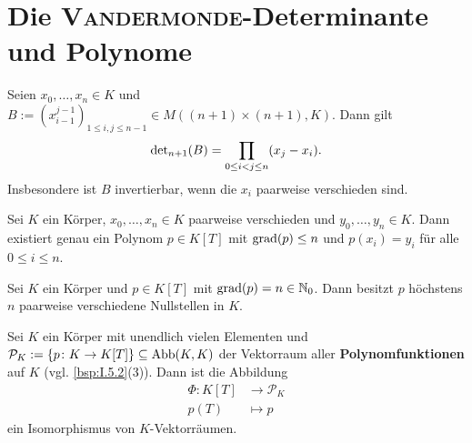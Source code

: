 \section{Die \textsc{Vandermonde}-Determinante und Polynome}

\begin{satz}
	\label{satz:I.15.1}
	Seien $x_0,\dots,x_n \in K$ und $B := (x_{i-1}^{j-1})_{1 \leq i,j \leq n-1} \in M((n+1) \times (n+1),K)$.
	Dann gilt 
	\[
		\operatorname{\det\,\!}_{n+1}(B) = \prod_{0 \leq i<j \leq n} (x_j-x_i).
	\]
	Insbesondere ist $B$ invertierbar, wenn die $x_i$ paarweise verschieden sind.
\end{satz}

\setcounter{definition}{2}
\begin{korollar}
	\label{kor:I.15.3}
	Sei $K$ ein Körper, $x_0, \dots, x_n \in K$ paarweise verschieden und $y_0, \dots, y_n \in K$.
	Dann existiert genau ein Polynom $p \in K[T]$ mit $\operatorname{grad}(p) \leq n$ und $p(x_i)=y_i$ für alle $0 \leq i \leq n$.
\end{korollar}

\begin{korollar}
	\label{kor:I.15.4}
	Sei $K$ ein Körper und $p \in K[T]$ mit $\operatorname{grad}(p) = n \in \mathbb{N}_0$.
	Dann besitzt $p$ höchstens $n$ paarweise verschiedene Nullstellen in $K$.
\end{korollar}

\setcounter{definition}{5}
\begin{satz}
	\label{satz:I.15.6}
	Sei $K$ ein Körper mit unendlich vielen Elementen und $\mathcal{P}_K := \{p \colon K \rightarrow K[T]\} \subseteq \operatorname{Abb}(K,K)$ der Vektorraum aller \textbf{Polynomfunktionen} auf $K$ (vgl. \autoref{bsp:I.5.2}(3)). 
	Dann ist die Abbildung
	\begin{align*}
		\Phi \colon K[T] &\longrightarrow \mathcal{P}_K \\
		p(T) &\longmapsto p
	\end{align*}
	ein Isomorphismus von $K$-Vektorräumen.
\end{satz}
\newpage